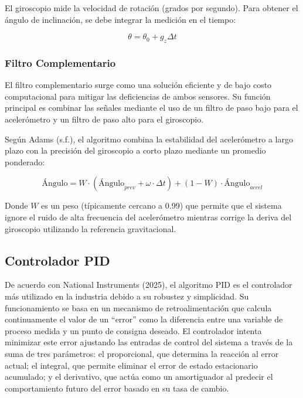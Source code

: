 \documentclass[12pt,letterpaper]{report}
\begin{document}
El giroscopio mide la velocidad de rotación (grados por segundo). Para obtener el ángulo de inclinación, se debe integrar la medición en el tiempo:

\begin{equation}
\theta = \theta_0 + g_z\Delta t
\end{equation}

\subsubsection{Filtro Complementario}

El filtro complementario surge como una solución eficiente y de bajo costo computacional para mitigar las deficiencias de ambos sensores. Su función principal es combinar las señales mediante el uso de un filtro de paso bajo para el acelerómetro y un filtro de paso alto para el giroscopio.

Según Adams (s.f.), el algoritmo combina la estabilidad del acelerómetro a largo plazo con la precisión del giroscopio a corto plazo mediante un promedio ponderado:

\begin{equation}
\text{Ángulo} = W \cdot (\text{Ángulo}_{prev} + \omega \cdot \Delta t) + (1-W) \cdot \text{Ángulo}_{accel}
\end{equation}

Donde $W$ es un peso (típicamente cercano a 0.99) que permite que el sistema ignore el ruido de alta frecuencia del acelerómetro mientras corrige la deriva del giroscopio utilizando la referencia gravitacional.

\subsection{Controlador PID}

De acuerdo con National Instruments (2025), el algoritmo PID es el controlador más utilizado en la industria debido a su robustez y simplicidad. Su funcionamiento se basa en un mecanismo de retroalimentación que calcula continuamente el valor de un ``error'' como la diferencia entre una variable de proceso medida y un punto de consigna deseado. El controlador intenta minimizar este error ajustando las entradas de control del sistema a través de la suma de tres parámetros: el proporcional, que determina la reacción al error actual; el integral, que permite eliminar el error de estado estacionario acumulado; y el derivativo, que actúa como un amortiguador al predecir el comportamiento futuro del error basado en su tasa de cambio.
\end{document}

